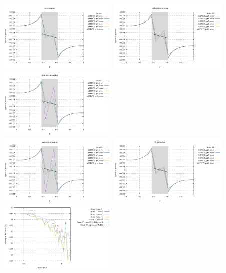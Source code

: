 \begin{center}
\includegraphics[width=5.7cm]{images/stokes_sphere2D/pressure_profile_none_FS.pdf}
\includegraphics[width=5.7cm]{images/stokes_sphere2D/pressure_profile_arithmetic_FS.pdf}
\includegraphics[width=5.7cm]{images/stokes_sphere2D/pressure_profile_geometric_FS.pdf}\\
\includegraphics[width=5.7cm]{images/stokes_sphere2D/pressure_profile_harmonic_FS.pdf}
\includegraphics[width=5.7cm]{images/stokes_sphere2D/pressure_profile_q1_FS.pdf}
\includegraphics[width=5.7cm]{images/stokes_sphere2D/center_velocity_FS}
\end{center}




